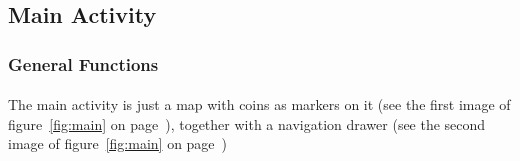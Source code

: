 \documentclass[12pt]{article}
\begin{document}
\subsection{Main Activity}
\subsubsection{General Functions}
\paragraph{}
The main activity is just a map with coins as markers on it (see the first image of figure~\ref{fig:main} on page~\pageref{fig:main}), together with a navigation drawer (see the second image of figure~\ref{fig:main} on page~\pageref{fig:main})
\end{document}
